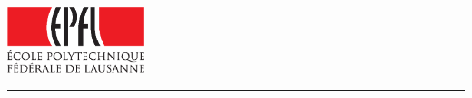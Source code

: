
%        




\newcommand{\logoepfl}[0]{
  \begin{center}
    \includegraphics[width=4cm]{logo_epfl_coul.eps}
  \end{center}
  \vspace{0.3cm}
  \hrule
}
\newcommand{\logolasec}[0]{
  \vspace{1cm}
  \hrule
  \begin{center}
    \texttt{[image: logo\_lasec\_coul.eps]}
  \end{center}
}
\newcommand{\project}[1]{
  \begin{center}
    \large{#1}
  \end{center}
  \vspace{1cm}
}
\newcommand{\department}[1]{
  \begin{center}
    \large{#1}
  \end{center}
}
\newcommand{\supervisor}[3]{
  \begin{center}
    \begin{normalsize}{
        \bf #1}\\#2\\#3
    \end{normalsize}
  \end{center}
}
\renewcommand{\author}[1]{
  \begin{center}
    \Large{#1}
  \end{center}
  \vspace{0.5cm}
}
\renewcommand{\title}[1]{
  \vspace{3cm}
  \begin{center}
    \huge{#1}
  \end{center}
  \vspace{1.7cm}
}
\renewcommand{\date}[2]{
  \begin{center}
    \normalsize{#1 #2}
  \end{center}
  \vspace{0.5cm}
}


\thispagestyle{empty}


  \logoepfl

